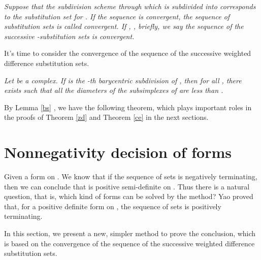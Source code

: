 \documentclass [10pt,a4paper]{article}
\begin{document}
\begin{definition}\label{sld5}
\emph{Suppose that the subdivision scheme through which  is
subdivided into  corresponds to the substitution set 
for
 . If the sequence  is convergent, the
 sequence of substitution sets
 is called convergent. If ,
, brief\mbox{}ly, we say the sequence of the
successive -substitution sets is convergent.}
\end{definition}
It's time to consider  the convergence of the sequence of the
successive weighted dif\mbox{}ference substitution sets.
\begin{lemma}\label{bs}
\emph{\cite{Edwin:1, James:1} Let  be a complex. If  is the
-th barycentric subdivision of , then for all ,
there exists  such that all the diameters of the
subsimplexes
 of  are less than . }
\end{lemma}

 By Lemma \ref{bs} , we have the following theorem,  which plays important
 roles
 in the proofs of Theorem \ref{zd} and Theorem \ref{ce} in the next sections.





\section{Nonnegativity decision of forms }
Given a form  on . We know that if the sequence of
sets  is negatively
terminating, then we can conclude that   is positive
semi-definite on . Thus there is a natural question,
that is, which kind of forms can be solved by the method? Yao
\cite{Yong:1} proved that, for a positive definite form  on
, the sequence of sets
 is positively terminating.

In this section, we present a new, simpler method to prove the
conclusion, which is based on the convergence
 of the sequence of the successive weighted dif\mbox{}ference substitution sets.
\end{document}
